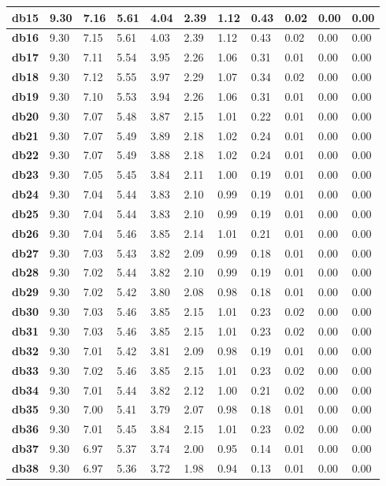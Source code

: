 \begin{tiny}
\begin{longtable}{|l|l|l|l|l|l|l|l|l|l|l|}
\textbf{db15}&9.30&7.16&5.61&4.04&2.39&1.12&0.43&0.02&0.00&0.00\\\hline
\textbf{db16}&9.30&7.15&5.61&4.03&2.39&1.12&0.43&0.02&0.00&0.00\\\hline
\textbf{db17}&9.30&7.11&5.54&3.95&2.26&1.06&0.31&0.01&0.00&0.00\\\hline
\textbf{db18}&9.30&7.12&5.55&3.97&2.29&1.07&0.34&0.02&0.00&0.00\\\hline
\textbf{db19}&9.30&7.10&5.53&3.94&2.26&1.06&0.31&0.01&0.00&0.00\\\hline
\textbf{db20}&9.30&7.07&5.48&3.87&2.15&1.01&0.22&0.01&0.00&0.00\\\hline
\textbf{db21}&9.30&7.07&5.49&3.89&2.18&1.02&0.24&0.01&0.00&0.00\\\hline
\textbf{db22}&9.30&7.07&5.49&3.88&2.18&1.02&0.24&0.01&0.00&0.00\\\hline
\textbf{db23}&9.30&7.05&5.45&3.84&2.11&1.00&0.19&0.01&0.00&0.00\\\hline
\textbf{db24}&9.30&7.04&5.44&3.83&2.10&0.99&0.19&0.01&0.00&0.00\\\hline
\textbf{db25}&9.30&7.04&5.44&3.83&2.10&0.99&0.19&0.01&0.00&0.00\\\hline
\textbf{db26}&9.30&7.04&5.46&3.85&2.14&1.01&0.21&0.01&0.00&0.00\\\hline
\textbf{db27}&9.30&7.03&5.43&3.82&2.09&0.99&0.18&0.01&0.00&0.00\\\hline
\textbf{db28}&9.30&7.02&5.44&3.82&2.10&0.99&0.19&0.01&0.00&0.00\\\hline
\textbf{db29}&9.30&7.02&5.42&3.80&2.08&0.98&0.18&0.01&0.00&0.00\\\hline
\textbf{db30}&9.30&7.03&5.46&3.85&2.15&1.01&0.23&0.02&0.00&0.00\\\hline
\textbf{db31}&9.30&7.03&5.46&3.85&2.15&1.01&0.23&0.02&0.00&0.00\\\hline
\textbf{db32}&9.30&7.01&5.42&3.81&2.09&0.98&0.19&0.01&0.00&0.00\\\hline
\textbf{db33}&9.30&7.02&5.46&3.85&2.15&1.01&0.23&0.02&0.00&0.00\\\hline
\textbf{db34}&9.30&7.01&5.44&3.82&2.12&1.00&0.21&0.02&0.00&0.00\\\hline
\textbf{db35}&9.30&7.00&5.41&3.79&2.07&0.98&0.18&0.01&0.00&0.00\\\hline
\textbf{db36}&9.30&7.01&5.45&3.84&2.15&1.01&0.23&0.02&0.00&0.00\\\hline
\textbf{db37}&9.30&6.97&5.37&3.74&2.00&0.95&0.14&0.01&0.00&0.00\\\hline
\textbf{db38}&9.30&6.97&5.36&3.72&1.98&0.94&0.13&0.01&0.00&0.00\\\hline

\end{longtable}
\end{tiny}
